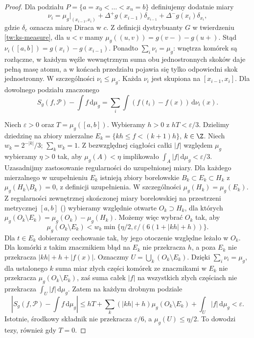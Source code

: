 \begin{proof}
Dla podziału $P=\{a=x_0<\dots<x_n=b\}$ definiujemy dodatnie miary
\[
 \nu_i=\mu_g|_{(x_{i-1},x_i)}
 +\Delta^+g(x_{i-1})\delta_{x_{i-1}}
 +\Delta^-g(x_i)\delta_{x_i},
\]
gdzie $\delta_c$ oznacza miarę Diraca w $c$. Z definicji dystrybuanty $G$ w twierdzeniu \ref{tw:ks-measure}, dla $u<v$ mamy
$\mu_g((u,v))=g(v-)-g(u+)$. Stąd $\nu_i([a,b])=g(x_i)-g(x_{i-1})$.
Ponadto $\sum_i\nu_i=\mu_g$: wnętrza komórek są rozłączne, w każdym węźle wewnętrznym suma obu jednostronnych skoków daje pełną masę atomu, a w końcach przedziału pojawia się tylko odpowiedni skok jednostronny. W szczególności $\nu_i\le\mu_g$. Każda $\nu_i$ jest skupiona na $[x_{i-1},x_i]$. Dla dowolnego podziału znaczonego
\[
 S_g(f,\mathcal P)-\int f\,\mathrm d\mu_g
 =\sum_i\int (f(t_i)-f(x))\,\mathrm d\nu_i(x).
\]

Niech $\varepsilon>0$ oraz $T=\mu_g([a,b])$. Wybieramy $h>0$ z $hT<\varepsilon/3$. Dzielimy dziedzinę na zbiory mierzalne $E_k=\{kh\le f<(k+1)h\}$, $k\in\Z$. Niech $w_k=2^{-|k|}/3$; $\sum_k w_k=1$. Z bezwzględnej ciągłości całki $|f|$ względem
$\mu_g$ wybieramy $\eta>0$ tak, aby $\mu_g(A)<\eta$ implikowało $\int_A|f|\,\mathrm d\mu_g<\varepsilon/3$. Uzasadnijmy zastosowanie regularności do uzupełnionej miary. Dla każdego mierzalnego w uzupełnieniu $E_k$ istnieją zbiory borelowskie $B_k\subset E_k\subset H_k$ z $\mu_g(H_k\setminus B_k)=0$, z definicji uzupełnienia. W szczególności $\mu_g(H_k)=\mu_g(E_k)$. Z regularności zewnętrznej skończonej miary borelowskiej
na przestrzeni metrycznej $[a,b]$
()
wybieramy względnie otwarte $O_k\supset H_k$, dla których $\mu_g(O_k\setminus E_k)=\mu_g(O_k)-\mu_g(H_k)$. Możemy więc wybrać $O_k$ tak, aby
\[
 \mu_g(O_k\setminus E_k)<w_k
 \min\{\eta/2,\varepsilon/(6(1+|kh|+h))\}.
\]
Dla $t\in E_k$ dobieramy cechowanie tak, by jego otoczenie względne leżało w $O_k$. Dla komórki z takim znacznikiem błąd na $E_k$ nie przekracza $h$, a poza $E_k$ nie przekracza $|kh|+h+|f(x)|$. Oznaczmy $U=\bigcup_k(O_k\setminus E_k)$. Dzięki $\sum_i\nu_i=\mu_g$, dla ustalonego $k$ suma miar złych części komórek ze znacznikami w $E_k$ nie przekracza $\mu_g(O_k\setminus E_k)$, zaś suma całek $|f|$ na wszystkich złych częściach nie przekracza $\int_U|f|\,\mathrm d\mu_g$. Zatem na każdym drobnym podziale
\[
 |S_g(f,\mathcal P)-\int f\,\mathrm d\mu_g|
 \le hT+\sum_k(|kh|+h)\mu_g(O_k\setminus E_k)
     +\int_U|f|\,\mathrm d\mu_g<\varepsilon.
\]
Istotnie, środkowy składnik nie przekracza $\varepsilon/6$, a $\mu_g(U)\le\eta/2$. To dowodzi tezy, również gdy $T=0$.
\end{proof}
